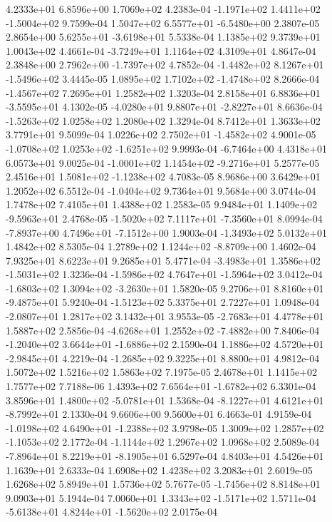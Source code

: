 4.2333e+01 6.8596e+00 1.7069e+02  4.2383e-04
-1.1971e+02  1.4411e+02 -1.5004e+02  9.7599e-04
 1.5047e+02  6.5577e+01 -6.5480e+00  2.3807e-05
 2.8654e+00  5.6255e+01 -3.6198e+01  5.5338e-04
1.1385e+02 9.3739e+01 1.0043e+02  4.4661e-04
-3.7249e+01  1.1164e+02  4.3109e+01  4.8647e-04
 2.3848e+00  2.7962e+00 -1.7397e+02  4.7852e-04
-1.4482e+02  8.1267e+01 -1.5496e+02  3.4445e-05
 1.0895e+02  1.7102e+02 -1.4748e+02  8.2666e-04
-1.4567e+02  7.2695e+01  1.2582e+02  1.3203e-04
 2.8158e+01  6.8836e+01 -3.5595e+01  4.1302e-05
-4.0280e+01  9.8807e+01 -2.8227e+01  8.6636e-04
-1.5263e+02  1.0258e+02  1.2080e+02  1.3294e-04
8.7412e+01 1.3633e+02 3.7791e+01  9.5099e-04
 1.0226e+02  2.7502e+01 -1.4582e+02  4.9001e-05
-1.0708e+02  1.0253e+02 -1.6251e+02  9.9993e-04
-6.7464e+00  4.4318e+01  6.0573e+01  9.0025e-04
-1.0001e+02  1.1454e+02 -9.2716e+01  5.2577e-05
 2.4516e+01  1.5081e+02 -1.1238e+02  4.7083e-05
8.9686e+00 3.6429e+01 1.2052e+02  6.5512e-04
-1.0404e+02  9.7364e+01  9.5684e+00  3.0744e-04
1.7478e+02 7.4105e+01 1.4388e+02  1.2583e-05
 9.9484e+01  1.1409e+02 -9.5963e+01  2.4768e-05
-1.5020e+02  7.1117e+01 -7.3560e+01  8.0994e-04
-7.8937e+00  4.7496e+01 -7.1512e+00  1.9003e-04
-1.3493e+02  5.0132e+01  1.4842e+02  8.5305e-04
 1.2789e+02  1.1244e+02 -8.8709e+00  1.4602e-04
7.9325e+01 8.6223e+01 9.2685e+01  5.4771e-04
-3.4983e+01  1.3586e+02 -1.5031e+02  1.3236e-04
-1.5986e+02  4.7647e+01 -1.5964e+02  3.0412e-04
-1.6803e+02  1.3094e+02 -3.2630e+01  1.5820e-05
 9.2706e+01  8.8160e+01 -9.4875e+01  5.9240e-04
-1.5123e+02  5.3375e+01  2.7227e+01  1.0948e-04
-2.0807e+01  1.2817e+02  3.1432e+01  3.9553e-05
-2.7683e+01  4.4778e+01  1.5887e+02  2.5856e-04
-4.6268e+01  1.2552e+02 -7.4882e+00  7.8406e-04
-1.2040e+02  3.6644e+01 -1.6886e+02  2.1590e-04
 1.1886e+02  4.5720e+01 -2.9845e+01  4.2219e-04
-1.2685e+02  9.3225e+01  8.8800e+01  4.9812e-04
1.5072e+02 1.5216e+02 1.5863e+02  7.1975e-05
2.4678e+01 1.1415e+02 1.7577e+02  7.7188e-06
 1.4393e+02  7.6564e+01 -1.6782e+02  6.3301e-04
 3.8596e+01  1.4800e+02 -5.0781e+01  1.5368e-04
-8.1227e+01  4.6121e+01 -8.7992e+01  2.1330e-04
9.6606e+00 9.5600e+01 6.4663e-01  4.9159e-04
-1.0198e+02  4.6490e+01 -1.2388e+02  3.9798e-05
 1.3009e+02  1.2857e+02 -1.1053e+02  2.1772e-04
-1.1144e+02  1.2967e+02  1.0968e+02  2.5089e-04
-7.8964e+01  8.2219e+01 -8.1905e+01  6.5297e-04
4.8403e+01 4.5426e+01 1.1639e+01  2.6333e-04
1.6908e+02 1.4238e+02 3.2083e+01  2.6019e-05
1.6268e+02 5.8949e+01 1.5736e+02  5.7677e-05
-1.7456e+02  8.8148e+01  9.0903e+01  5.1944e-04
 7.0060e+01  1.3343e+02 -1.5171e+02  1.5711e-04
-5.6138e+01  4.8244e+01 -1.5620e+02  2.0175e-04
